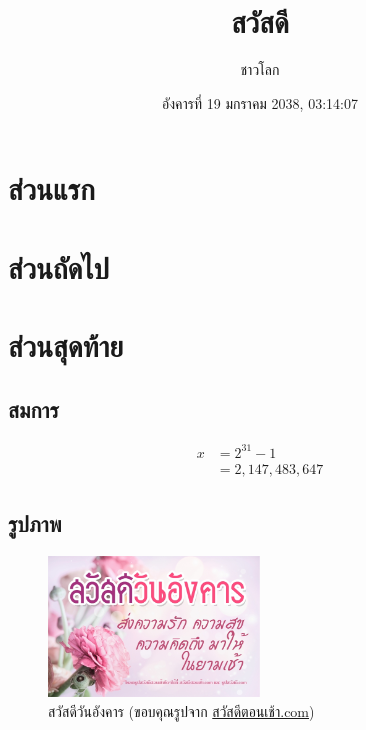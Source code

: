 \documentclass{article}
\title{\textbf{สวัสดี}\vspace{-2ex}}
\author{ชาวโลก}
\date{อังคารที่ 19 มกราคม 2038, 03:14:07}
\begin{document}
\begin{titlepage}
\maketitle
\thispagestyle{empty}
\tableofcontents
\end{titlepage}

\newpage
{}
\section{ส่วนแรก}
\begin{otherlanguage}{english}
\blindtext[8]
\end{otherlanguage}

\section{ส่วนถัดไป}
\begin{otherlanguage}{english}
\blindtext[10]
\end{otherlanguage}

\newpage
\section{ส่วนสุดท้าย}
\subsection{สมการ}
\begin{align*}
x   &= 2^{31} - 1\\
    &= 2,147,483,647
\end{align*}

\subsection{รูปภาพ}
\begin{figure}[htp]
\centering
\includegraphics[width=0.5\textwidth]{images/happy_tue.jpeg}
\caption[สวัสดีวันอังคาร]{สวัสดีวันอังคาร (ขอบคุณรูปจาก \href{https://xn--b3ctdq1erb0a6aq2a9k0e.com/}{สวัสดีตอนเช้า.com})}
\end{figure}
\end{document}

